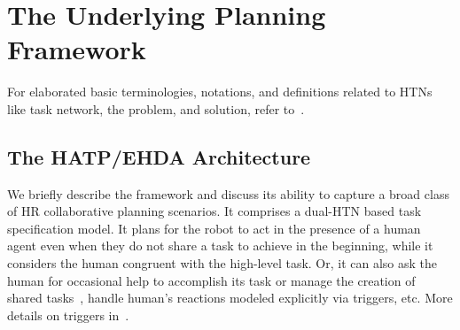 \documentclass[letterpaper]{article} %
\newtheorem{definition}{Definition}
\begin{document}
\section{The Underlying Planning Framework}
For elaborated basic terminologies, notations, and definitions related to HTNs like task network, the problem, and solution, refer to~\cite{naubooks0014222}.  


\subsection{The HATP/EHDA Architecture}
We briefly describe the framework and discuss its ability to capture a broad class of HR collaborative planning scenarios. 
It comprises a dual-HTN based task specification model. It plans for the robot to act in the presence of a human agent even when they do not share a task to achieve in the beginning, while it considers the human congruent with the high-level task. 
Or, it can also ask the human for occasional help to accomplish its task or manage the creation of shared tasks~\cite{buisan:hal-03684211}, handle human's reactions modeled explicitly via triggers, etc. More details on triggers  in~\cite{ingrand1996prs,AlamiCFGI98}.  
\end{document}
